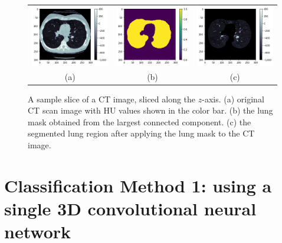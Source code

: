 \documentclass{article}
\begin{document}
\begin{figure}[t]
  \centering
  \begin{tabular}{ccc}
  \includegraphics[height=100px]{figures/lung_seg_1.png} &
  \includegraphics[height=100px]{figures/lung_seg_2.png} &
  \includegraphics[height=100px]{figures/lung_seg_3.png} \\
  (a) & (b) & (c) \\
  \end{tabular}
  \caption{A sample slice of a CT image, sliced along the $z$-axis. (a) original CT scan image with HU values shown in the color bar. (b) the lung mask obtained from the largest connected component. (c) the segmented lung region after applying the lung mask to the CT image.}
  \label{fig:lung_segmentation}
\end{figure}

\section{Classification Method 1: using a single 3D convolutional neural network}
\label{sec:method1}
\end{document}

